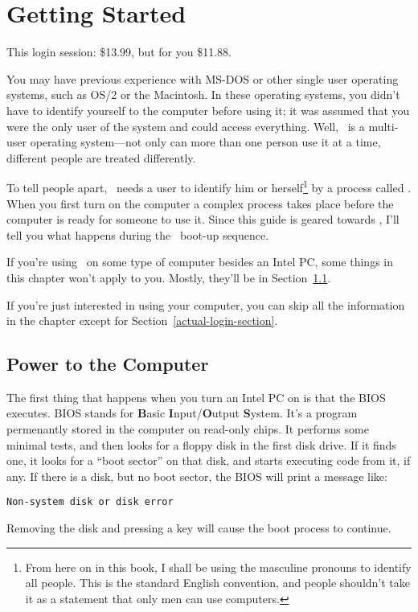 \chapter{Getting Started}\label{bootup}

\begin{fortune}
This login session: \$13.99, but for you \$11.88.
\end{fortune}

You may have previous experience with MS-DOS or other
single user operating systems, such as OS/2 or the
Macintosh.  In these operating systems, you didn't
have to identify yourself to the computer before using it; it was
assumed that you were the only user of the system and could access
everything. Well, \unix\ is a multi-user operating system---not only
can more than one person use it at a time, different people are
treated differently.

To tell people apart, \unix\ needs a user to identify him or
herself\footnote{From here on in this book, I shall be using the
masculine pronouns to identify all people.  This is the standard
English convention, and people shouldn't take it as a statement that
only men can use computers.} by a process called .
When you first turn on the computer a complex process takes place
before the computer is ready for someone to use it.
Since this guide is geared towards \linux,
I'll tell you what happens during the \linux\ boot-up
sequence.

If you're using \linux\ on some type of computer besides an
Intel PC, some things in this chapter won't apply to you.
Mostly, they'll be in Section~\ref{intel-powerup}.

If you're just interested in using your computer, you can skip all the
information in the chapter except for
Section~\ref{actual-login-section}.

\section{Power to the Computer}\label{intel-powerup}

The first thing that happens when you turn an Intel PC on
is that the BIOS executes. BIOS
stands for {\bf B}asic {\bf I}nput/{\bf O}utput {\bf S}ystem.  It's a
program permenantly stored in the computer on read-only chips.  It
performs some minimal tests, and then looks for a floppy disk in the
first disk drive.  If it finds one, it looks for a ``boot sector'' on
that disk, and starts executing code from it, if any.  If there is a
disk, but no boot sector, the BIOS will print a message like:
\begin{screen}\begin{verbatim}
Non-system disk or disk error
\end{verbatim}\end{screen}
Removing the disk and pressing a key will cause the boot process to
continue.

